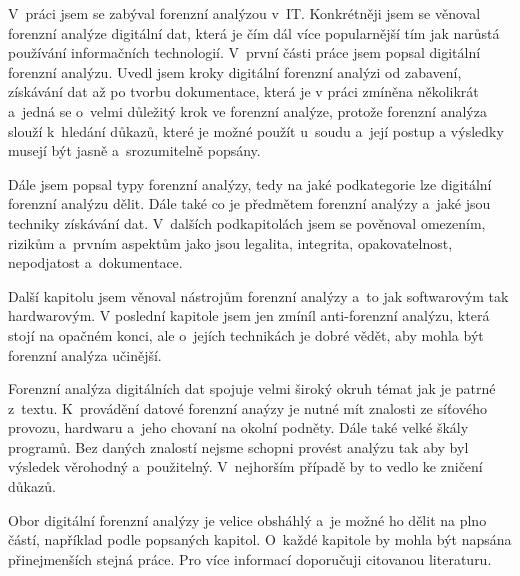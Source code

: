\documentclass[thesis=B,czech]{FITthesis}[2012/06/26]
\begin{document}
\begin{conclusion}
V~práci jsem se zabýval forenzní analýzou v~IT. Konkrétněji jsem se věnoval forenzní analýze digitální dat, která je čím dál více popularnější tím jak narůstá používání informačních technologií. V~první části práce jsem popsal digitální forenzní analýzu. Uvedl jsem kroky digitální forenzní analýzi od zabavení, získávání dat až po tvorbu dokumentace, která je v práci zmíněna několikrát a~jedná se o~velmi důležitý krok ve forenzní analýze, protože forenzní analýza slouží k~hledání důkazů, které je možné použít u~soudu a~její postup a výsledky musejí být jasně a~srozumitelně popsány. 

Dále jsem popsal typy forenzní analýzy, tedy na jaké podkategorie lze digitální forenzní analýzu dělit. Dále také co je předmětem forenzní analýzy a~jaké jsou techniky získávání dat. V~dalších podkapitolách jsem se pověnoval omezením, rizikům a~prvním aspektům jako jsou legalita, integrita, opakovatelnost, nepodjatost a~dokumentace. 

Další kapitolu jsem věnoval nástrojům forenzní analýzy a~to jak softwarovým tak hardwarovým. V poslední kapitole jsem jen zmíníl anti-forenzní analýzu, která stojí na opačném konci, ale o~jejích technikách je dobré vědět, aby mohla být forenzní analýza učinější. 

Forenzní analýza digitálních dat spojuje velmi široký okruh témat jak je patrné z~textu. K~provádění datové forenzní anaýzy je nutné mít znalosti ze síťového provozu, hardwaru a~jeho chovaní na okolní podněty. Dále také velké škály programů. Bez daných znalostí nejsme schopni provést analýzu tak aby byl výsledek věrohodný a~použitelný. V~nejhorším případě by to vedlo ke zničení důkazů. 

Obor digitální forenzní analýzy je velice obsháhlý a~je možné ho dělit na plno částí, například podle popsaných kapitol. O~každé kapitole by mohla být napsána přinejmenších stejná práce. Pro více informací doporučuji citovanou literaturu.


\end{conclusion}




\appendix
\end{document}
